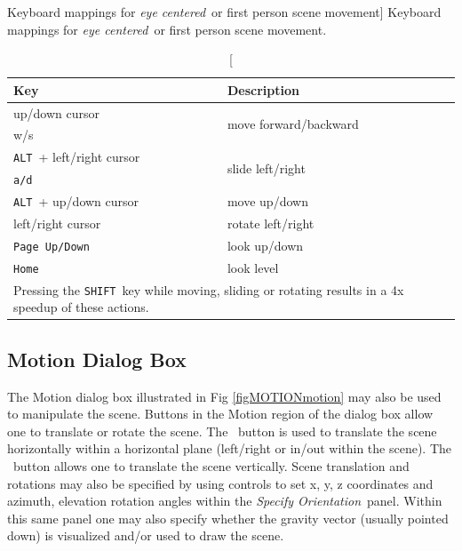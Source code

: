 \documentclass[11pt,twoside]{book}
\newcommand{\frameit}[1]{\fbox{\tt #1}}
\begin{document}
\begin{table}[bph]
\begin{center}
\caption
[Keyboard mappings for {\em eye centered}\ or first person scene movement]
{Keyboard mappings for {\em eye centered}\ or first person scene movement.}
\vspace{0.1in}
\begin{tabular}{|l|l|}
\hline Key &   Description  \\

\hline\hline
up/down cursor & \multirow{2}{*}{move forward/backward}\  \\
w/s &   \\\hline
{\tt ALT}\ + left/right cursor  & \multirow{2}{*}{slide left/right}\ \\
{\tt a/d}\  &  \\ \hline
{\tt ALT}\ + up/down cursor  & move up/down  \\ \hline\hline
left/right cursor  & rotate left/right \\ \hline
{\tt Page Up/Down}\  & look up/down \\ \hline
{\tt Home}\  & look level \\ \hline\hline
\multicolumn{2}{|p{3.5in}|}{Pressing the {\tt SHIFT}\ key while moving, sliding or rotating
results in a  4x speedup of these actions. }\ \\ \hline

\end{tabular}
\label{tabKEYS}
\end{center}
\end{table}

\subsection{Motion Dialog Box}
The Motion dialog box illustrated in Fig \ref{figMOTIONmotion} may also be used to manipulate the
scene. Buttons in the Motion
region of the dialog box allow one to translate or rotate the scene. The
\frameit{Horizontal}\ button is used to translate the scene
horizontally within a horizontal plane (left/right or in/out within the scene).  The
\frameit{Vertical}\ button allows one to translate the scene vertically.
Scene translation and rotations may also be specified by using controls to set x, y, z
coordinates and azimuth, elevation rotation angles within the {\em Specify Orientation}\ panel.
Within this same panel one may also specify whether the gravity vector (usually pointed down) is visualized and/or used to draw the scene.
\end{document}
